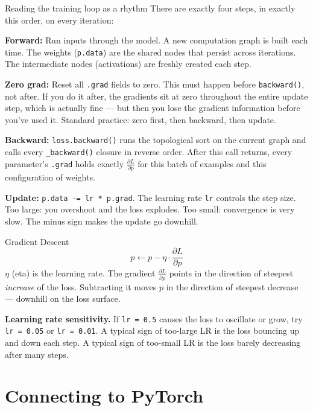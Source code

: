 \documentclass[12pt,a4paper]{article}
\newcommand{\code}[1]{\texttt{\small\color{deepblue}#1}}
\begin{document}
\begin{codeexplainbox}{Reading the training loop as a rhythm}
There are exactly four steps, in exactly this order, on every iteration:

\textbf{Forward:} Run inputs through the model. A new computation graph is built each time. The weights (\code{p.data}) are the shared nodes that persist across iterations. The intermediate nodes (activations) are freshly created each step.

\textbf{Zero grad:} Reset all \code{.grad} fields to zero. This must happen before \code{backward()}, not after. If you do it after, the gradients sit at zero throughout the entire update step, which is actually fine — but then you lose the gradient information before you've used it. Standard practice: zero first, then backward, then update.

\textbf{Backward:} \code{loss.backward()} runs the topological sort on the current graph and calls every \code{\_backward()} closure in reverse order. After this call returns, every parameter's \code{.grad} holds exactly $\frac{\partial L}{\partial p}$ for this batch of examples and this configuration of weights.

\textbf{Update:} \code{p.data -= lr * p.grad}. The learning rate \code{lr} controls the step size. Too large: you overshoot and the loss explodes. Too small: convergence is very slow. The minus sign makes the update go downhill.
\end{codeexplainbox}

\begin{mathbox}{Gradient Descent}
\[
p \leftarrow p - \eta \cdot \frac{\partial L}{\partial p}
\]
$\eta$ (eta) is the learning rate. The gradient $\frac{\partial L}{\partial p}$ points in the direction of steepest \emph{increase} of the loss. Subtracting it moves $p$ in the direction of steepest decrease — downhill on the loss surface.
\end{mathbox}

\begin{warnbox}
\textbf{Learning rate sensitivity.} If \code{lr = 0.5} causes the loss to oscillate or grow, try \code{lr = 0.05} or \code{lr = 0.01}. A typical sign of too-large LR is the loss bouncing up and down each step. A typical sign of too-small LR is the loss barely decreasing after many steps.
\end{warnbox}

\section{Connecting to PyTorch}
\end{document}
